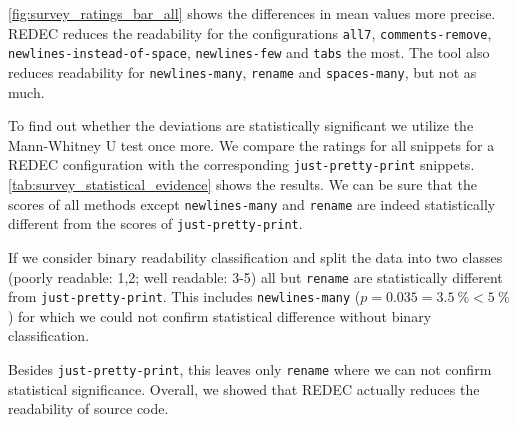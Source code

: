 \documentclass[%
class=scrreprt,
chapterprefix=false,%
open=right,%
twoside=false,%
paper=a4,%
logofile={Logo\_zentral\_farbig\_EN.png},%
thesistype=master,%
UKenglish,%
]{se2thesis}
\theoremstyle{definition}
\newcommand{\rdh}{REDEC\xspace}
\newcommand{\none}{just-pretty-print\xspace} %
\newcommand{\nonet}{\texttt{\none}\xspace} %
\begin{document}
	\begin{sloppypar}
	\autoref{fig:survey_ratings_bar_all} shows the differences in mean values more precise. \rdh reduces the readability for the configurations \texttt{all7}, \texttt{comments-remove}, \texttt{newlines-instead-of-space}, \texttt{newlines-few} and \texttt{tabs} the most. The tool also reduces readability for \texttt{newlines-many}, \texttt{rename} and \texttt{spaces-many}, but not as much. 
	\end{sloppypar}
	To find out whether the deviations are statistically significant we utilize the Mann-Whitney U test once more. We compare the ratings for all snippets for a \rdh configuration with the corresponding \nonet snippets. \autoref{tab:survey_statistical_evidence} shows the results.
	We can be sure that the scores of all methods except \texttt{newlines-many} and \texttt{rename} are indeed statistically different from the scores of \nonet. 
	
	If we consider binary readability classification and split the data into two classes (poorly readable: 1,2; well readable: 3-5) all but \texttt{rename} are statistically different from \nonet. This includes \texttt{newlines-many} ($p=0.035=3.5~\% < 5~\%$) for which we could not confirm statistical difference without binary classification.

	Besides \nonet, this leaves only \texttt{rename} where we can not confirm statistical significance. Overall, we showed that \rdh actually reduces the readability of source code.
\end{document}

